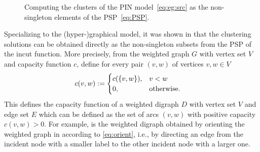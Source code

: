 \documentclass[conference,letterpaper]{IEEEtran}
\begin{document}
\begin{figure*}
	\begin{center}
		\hfill
		\hfill
	\end{center}
	\caption{Computing the clusters of the PIN model~\eqref{eq:eg:src} as the non-singleton elements of the PSP~\eqref{eq:PSP}.}
	\label{fig:eg:PSP}
\end{figure*}

Specializing to the (hyper-)graphical model, it was shown in \cite[Proposition~8]{chan16cluster}
that the clustering solutions can be obtained directly as the non-singleton subsets from the PSP of
the incut function.
More precisely, from the weighted graph $G$ with vertex set $V$ and capacity function $c$, define
for every pair $(v,w)$ of vertices $v,w\in V$ 
\begin{align}
  \label{eq:orient}
  c(v,w)&:=
  \begin{cases}
    c(\{v,w\}), & v<w\\
    0, & \text{otherwise.}
  \end{cases}
\end{align}
This defines the capacity function of a weighted digraph $D$ with vertex set $V$ and edge set $E$
which can be defined as the set of arcs $(v,w)$ with positive capacity $c(v,w)>0$. For example,
 is the weighted digraph obtained by orienting the weighted graph in
 according to \eqref{eq:orient}, i.e., by directing an edge from the incident
node with a smaller label to the other incident node with a larger one.
\end{document}
